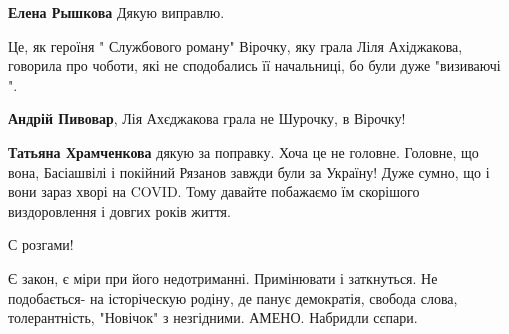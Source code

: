 \begin{itemize}
\begin{itemize}
\textbf{Елена Рышкова} Дякую виправлю.
\end{itemize}

 

Це, як героїня " Службового роману" Вірочку, яку грала Ліля Ахіджакова,
говорила про чоботи, які не сподобались її начальниці, бо були дуже "визиваючі
".

\begin{itemize}
 
\textbf{Андрій Пивовар}, Лія Ахєджакова грала не Шурочку, в Вірочку!

 
\textbf{Татьяна Храмченкова} дякую за поправку. Хоча це не головне. Головне, що вона, Басіашвілі і покійний Рязанов завжди були за Україну! Дуже сумно, що і вони зараз хворі на COVID. Тому давайте побажаємо їм скорішого виздоровлення і довгих років життя.
\end{itemize}

 
С розгами!

 

Є закон, є міри при його недотриманні. Примінювати і заткнуться. Не подобається-
на історіческую родіну, де панує демократія, свобода
слова, толерантність, "Новічок" з незгідними. АМЕНО. Набридли сєпари.


\end{itemize}
